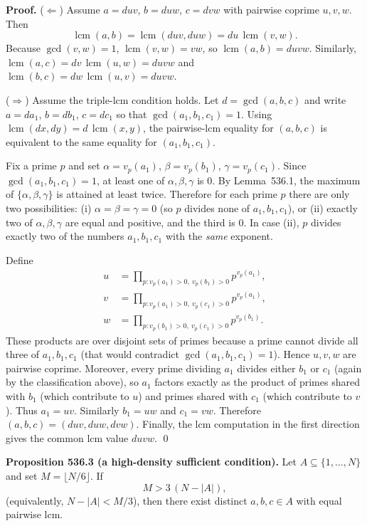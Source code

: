 \textbf{Proof.}
($\Leftarrow$) Assume $a=d u v$, $b=d u w$, $c=d v w$ with pairwise coprime $u,v,w$.
Then
\[
\operatorname{lcm}(a,b)=\operatorname{lcm}(d u v, d u w)=d u\,\operatorname{lcm}(v,w).
\]
Because $\gcd(v,w)=1$, $\operatorname{lcm}(v,w)=vw$, so $\operatorname{lcm}(a,b)=d u v w$.
Similarly, $\operatorname{lcm}(a,c)=d v\,\operatorname{lcm}(u,w)=d u v w$ and $\operatorname{lcm}(b,c)=d w\,\operatorname{lcm}(u,v)=d u v w$.

($\Rightarrow$) Assume the triple-lcm condition holds.
Let $d=\gcd(a,b,c)$ and write $a=d a_1$, $b=d b_1$, $c=d c_1$ so that $\gcd(a_1,b_1,c_1)=1$.
Using $\operatorname{lcm}(d x, d y)=d\,\operatorname{lcm}(x,y)$, the pairwise-lcm equality for $(a,b,c)$ is equivalent to the same equality for $(a_1,b_1,c_1)$.

Fix a prime $p$ and set $\alpha=v_p(a_1)$, $\beta=v_p(b_1)$, $\gamma=v_p(c_1)$.
Since $\gcd(a_1,b_1,c_1)=1$, at least one of $\alpha,\beta,\gamma$ is $0$.
By Lemma~536.1, the maximum of $\{\alpha,\beta,\gamma\}$ is attained at least twice.
Therefore for each prime $p$ there are only two possibilities:
(i) $\alpha=\beta=\gamma=0$ (so $p$ divides none of $a_1,b_1,c_1$), or
(ii) exactly two of $\alpha,\beta,\gamma$ are equal and positive, and the third is $0$.
In case (ii), $p$ divides exactly two of the numbers $a_1,b_1,c_1$ with the \emph{same} exponent.

Define
\begin{align*}
 u &= \prod_{p: v_p(a_1)>0,\ v_p(b_1)>0} p^{v_p(a_1)} ,\\
 v &= \prod_{p: v_p(a_1)>0,\ v_p(c_1)>0} p^{v_p(a_1)} ,\\
 w &= \prod_{p: v_p(b_1)>0,\ v_p(c_1)>0} p^{v_p(b_1)}.
\end{align*}
These products are over disjoint sets of primes because a prime cannot divide all three of $a_1,b_1,c_1$ (that would contradict $\gcd(a_1,b_1,c_1)=1$).
Hence $u,v,w$ are pairwise coprime.
Moreover, every prime dividing $a_1$ divides either $b_1$ or $c_1$ (again by the classification above), so $a_1$ factors exactly as the product of primes shared with $b_1$ (which contribute to $u$) and primes shared with $c_1$ (which contribute to $v$). Thus $a_1=uv$.
Similarly $b_1=uw$ and $c_1=vw$.
Therefore $(a,b,c)=(d u v, d u w, d v w)$.
Finally, the lcm computation in the first direction gives the common lcm value $d u v w$. \qed

\medskip
\textbf{Proposition 536.3 (a high-density sufficient condition).}
Let $A\subseteq\{1,\dots,N\}$ and set $M=\lfloor N/6\rfloor$.
If
\[
M>3\,(N-|A|),
\]
(equivalently, $N-|A|<M/3$), then there exist distinct $a,b,c\in A$ with equal pairwise lcm.

